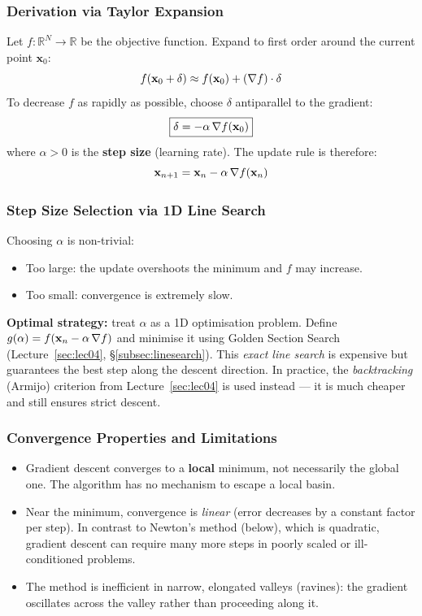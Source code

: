 \subsubsection{Derivation via Taylor Expansion}
Let $f : \mathbb{R}^N \to \mathbb{R}$ be the objective function. Expand to
first order around the current point $\mathbf{x}_0$:
\begin{equation}
f(\mathbf{x}_0 + \delta) \approx f(\mathbf{x}_0) + (\nabla f)\cdot\delta
\end{equation}
To decrease $f$ as rapidly as possible, choose $\delta$ antiparallel to the
gradient:
\begin{equation}
\boxed{\delta = -\alpha\,\nabla f(\mathbf{x}_0)}
\end{equation}
where $\alpha > 0$ is the \textbf{step size} (learning rate). The update rule
is therefore:
\begin{equation}
\mathbf{x}_{n+1} = \mathbf{x}_n - \alpha\,\nabla f(\mathbf{x}_n)
\end{equation}

\subsubsection{Step Size Selection via 1D Line Search}
Choosing $\alpha$ is non-trivial:
\begin{itemize}
    \item Too large: the update overshoots the minimum and $f$ may increase.
    \item Too small: convergence is extremely slow.
\end{itemize}
\noindent\textbf{Optimal strategy:} treat $\alpha$ as a 1D optimisation
problem. Define $g(\alpha) = f(\mathbf{x}_n - \alpha\,\nabla f)$ and minimise
it using Golden Section Search (Lecture~\ref{sec:lec04},
\S\ref{subsec:linesearch}). This \emph{exact line search} is expensive but
guarantees the best step along the descent direction. In practice, the
\emph{backtracking} (Armijo) criterion from Lecture~\ref{sec:lec04} is used
instead — it is much cheaper and still ensures strict descent.

\subsubsection{Convergence Properties and Limitations}
\begin{itemize}
    \item Gradient descent converges to a \textbf{local} minimum, not
    necessarily the global one. The algorithm has no mechanism to escape a
    local basin.
    \item Near the minimum, convergence is \emph{linear} (error decreases by
    a constant factor per step). In contrast to Newton's method (below),
    which is quadratic, gradient descent can require many more steps in
    poorly scaled or ill-conditioned problems.
    \item The method is inefficient in narrow, elongated valleys (ravines):
    the gradient oscillates across the valley rather than proceeding along it.
\end{itemize}

